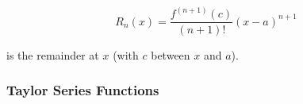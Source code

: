 \begin{equation}
    R_n(x) = \frac{f^{(n + 1)}(c)}{(n + 1)!}(x - a)^{n + 1}
\end{equation}

is the remainder at $x$ (with $c$ between $x$ and $a$).

\subsubsection{Taylor Series Functions}
\begin{center}
\end{center}
